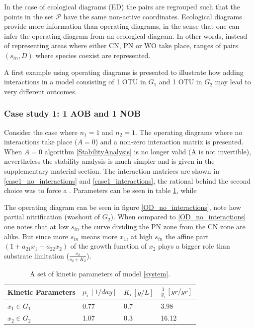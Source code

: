 \documentclass[3p,times]{article}
\begin{document}
In the case of ecological diagrams (ED) the pairs are regrouped such that the points in the set $\mathcal{P}$ have the same non-active coordinates. Ecological diagrams provide more information than operating diagrams, in the sense that one can infer the operating diagram from an ecological diagram. In other words, instead of representing areas where either CN, PN or WO take place, ranges of pairs $(s_{in},D)$ where species coexist are represented.	

A first example using operating diagrams is presented to illustrate how adding interactions in a model consisting of 1 OTU in $G_1$ and 1 OTU in $G_2$ may lead to very different outcomes.

\subsubsection{Case study 1: 1 AOB and 1 NOB}

Consider the case where $n_1 = 1$ and $n_2 = 1$. The operating diagrams where no interactions take place ($A = 0$) and a non-zero interaction matrix is presented. When $A=0$ algorithm \ref{StabilityAnalysis} is no longer valid (A is not invertible), nevertheless the stability analysis is much simpler and is given in the supplementary material section. The interaction matrices are shown in \ref{case1_no_interactions} and \ref{case1_interactions}, the rational behind the second choice was to force a . Parameters can be seen in table \ref{kinetic_parameters_case_study_1}, while 

The operating diagram can be seen in figure \ref{OD_no_interactions}, note how partial nitrification (washout of $G_2$). When compared to \ref{OD_no_interactions} one notes that at low $s_{in}$ the curve dividing the PN zone from the CN zone are alike. But since more $s_{in}$ means more $x_1$, at high $s_{in}$ the affine part $(1+ a_{21}x_1 +a_{22}x_2)$ of the growth function of $x_2$ plays a bigger role than substrate limitation ($\frac{s_2}{s_2+K_2}$).


\begin{table}[ht]
	\centering
	\begin{tabular}{|l|l|l|l|}
		\hline
		Kinetic Parameters & $\mu_i\,[1/day]$ & $K_i\,[g/L]$ & $\frac{1}{y_i} \, [gr/gr]$ \\ \hline
		$x_1 \in G_1$ & 0.77  & 0.7 & 3.98  \\ \hline
		$x_2\in G_2$ & 1.07 & 0.3 &  16.12 \\ \hline
	\end{tabular}	
	\caption{A set of kinetic parameters of model \eqref{system}.}
	\label{kinetic_parameters_case_study_1}
\end{table}
\end{document}
